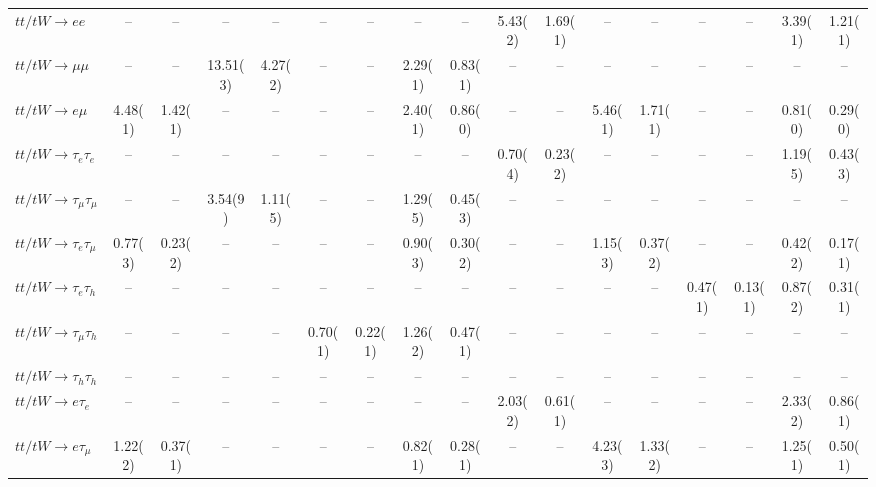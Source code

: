 \begin{sidewaystable}[p]
\begin{tabular}{|l|cc|cc|cc|cc|cc|cc|cc|cc|}
    $tt/tW \to ee$                     &    --    &    --    &    --    &    --    &    --    &    --    &    --    &    --    &  5.43(2) &  1.69(1) &    --    &    --    &    --    &    --    &  3.39(1) &  1.21(1) \\ 
    $tt/tW \to \mu\mu$                 &    --    &    --    & 13.51(3) &  4.27(2) &    --    &    --    &  2.29(1) &  0.83(1) &    --    &    --    &    --    &    --    &    --    &    --    &    --    &    --    \\ 
    $tt/tW \to e\mu$                   &  4.48(1) &  1.42(1) &    --    &    --    &    --    &    --    &  2.40(1) &  0.86(0) &    --    &    --    &  5.46(1) &  1.71(1) &    --    &    --    &  0.81(0) &  0.29(0) \\ 
    $tt/tW \to \tau_{e}\tau_{e}$       &    --    &    --    &    --    &    --    &    --    &    --    &    --    &    --    &  0.70(4) &  0.23(2) &    --    &    --    &    --    &    --    &  1.19(5) &  0.43(3) \\ 
    $tt/tW \to \tau_{\mu}\tau_{\mu}$   &    --    &    --    &  3.54(9) &  1.11(5) &    --    &    --    &  1.29(5) &  0.45(3) &    --    &    --    &    --    &    --    &    --    &    --    &    --    &    --    \\ 
    $tt/tW \to \tau_{e}\tau_{\mu}$     &  0.77(3) &  0.23(2) &    --    &    --    &    --    &    --    &  0.90(3) &  0.30(2) &    --    &    --    &  1.15(3) &  0.37(2) &    --    &    --    &  0.42(2) &  0.17(1) \\ 
    $tt/tW \to \tau_{e}\tau_{h}$       &    --    &    --    &    --    &    --    &    --    &    --    &    --    &    --    &    --    &    --    &    --    &    --    &  0.47(1) &  0.13(1) &  0.87(2) &  0.31(1) \\ 
    $tt/tW \to \tau_{\mu}\tau_{h}$     &    --    &    --    &    --    &    --    &  0.70(1) &  0.22(1) &  1.26(2) &  0.47(1) &    --    &    --    &    --    &    --    &    --    &    --    &    --    &    --    \\ 
    $tt/tW \to \tau_{h}\tau_{h}$       &    --    &    --    &    --    &    --    &    --    &    --    &    --    &    --    &    --    &    --    &    --    &    --    &    --    &    --    &    --    &    --    \\ 
    $tt/tW \to e\tau_{e}$              &    --    &    --    &    --    &    --    &    --    &    --    &    --    &    --    &  2.03(2) &  0.61(1) &    --    &    --    &    --    &    --    &  2.33(2) &  0.86(1) \\ 
    $tt/tW \to e\tau_{\mu}$            &  1.22(2) &  0.37(1) &    --    &    --    &    --    &    --    &  0.82(1) &  0.28(1) &    --    &    --    &  4.23(3) &  1.33(2) &    --    &    --    &  1.25(1) &  0.50(1) \\ 

\end{tabular}
\end{sidewaystable}
